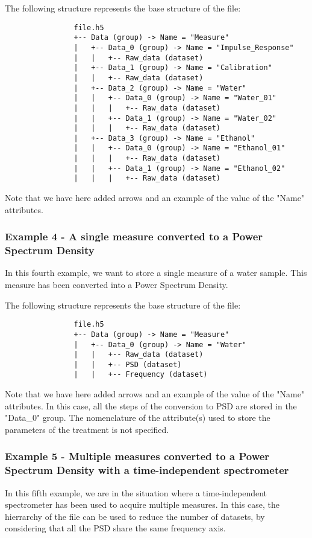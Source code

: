 \documentclass{article}
\begin{document}
            The following structure represents the base structure of the file:
            \begin{verbatim}
                file.h5
                +-- Data (group) -> Name = "Measure"
                |   +-- Data_0 (group) -> Name = "Impulse_Response"
                |   |   +-- Raw_data (dataset)
                |   +-- Data_1 (group) -> Name = "Calibration"
                |   |   +-- Raw_data (dataset)
                |   +-- Data_2 (group) -> Name = "Water"
                |   |   +-- Data_0 (group) -> Name = "Water_01"
                |   |   |   +-- Raw_data (dataset)
                |   |   +-- Data_1 (group) -> Name = "Water_02"
                |   |   |   +-- Raw_data (dataset)
                |   +-- Data_3 (group) -> Name = "Ethanol"
                |   |   +-- Data_0 (group) -> Name = "Ethanol_01"
                |   |   |   +-- Raw_data (dataset)
                |   |   +-- Data_1 (group) -> Name = "Ethanol_02"
                |   |   |   +-- Raw_data (dataset)
            \end{verbatim}
            Note that we have here added arrows and an example of the value of the "Name" attributes.
        
        \subsubsection{Example 4 - A single measure converted to a Power Spectrum Density}
            In this fourth example, we want to store a single measure of a water sample. This measure has been converted into a Power Spectrum Density.

            The following structure represents the base structure of the file:
            \begin{verbatim}
                file.h5
                +-- Data (group) -> Name = "Measure"
                |   +-- Data_0 (group) -> Name = "Water"
                |   |   +-- Raw_data (dataset)
                |   |   +-- PSD (dataset)
                |   |   +-- Frequency (dataset)
            \end{verbatim}
            Note that we have here added arrows and an example of the value of the "Name" attributes.
            In this case, all the steps of the conversion to PSD are stored in the "Data\_0" group. The nomenclature of the attribute(s) used to store the parameters of the treatment is not specified.
        
        \subsubsection{Example 5 - Multiple measures converted to a Power Spectrum Density with a time-independent spectrometer}
            In this fifth example, we are in the situation where a time-independent spectrometer has been used to acquire multiple measures. In this case, the hierrarchy of the file can be used to reduce the number of datasets, by considering that all the PSD share the same frequency axis.
\end{document}
